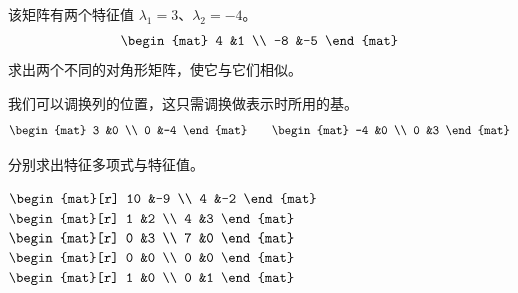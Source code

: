 \begin{exercises}
  \item 该矩阵有两个特征值 $\lambda_1=3$、$\lambda_2=-4$。
    \begin{equation*}
      \begin{mat}
        4  &1 \\
        -8 &-5
      \end{mat}
    \end{equation*}
    求出两个不同的对角形矩阵，使它与它们相似。
    \begin{answer}
      我们可以调换列的位置，这只需调换做表示时所用的基。
      \begin{equation*}
        \begin{mat} 
          3 &0 \\ 
          0 &-4
        \end{mat}
        \qquad
        \begin{mat} 
          -4 &0 \\ 
          0 &3
        \end{mat}
      \end{equation*}
    \end{answer}
  \item 
    分别求出特征多项式与特征值。
    \begin{exparts*}
      \partsitem \( \begin{mat}[r]
                 10  &-9 \\
                  4  &-2
            \end{mat}  \)
      \partsitem $\begin{mat}[r]
                    1  &2  \\
                    4  &3  
                 \end{mat}$
      \partsitem \( \begin{mat}[r]
                  0  &3  \\
                  7 &0
                 \end{mat} \)
      \partsitem \( \begin{mat}[r]  
                  0  &0  \\
                  0  &0
            \end{mat}  \)
      \partsitem \( \begin{mat}[r]
                  1  &0  \\
                  0  &1
            \end{mat}  \)
    \end{exparts*}
    \begin{answer}

\end{answer}
\end{exercises}

